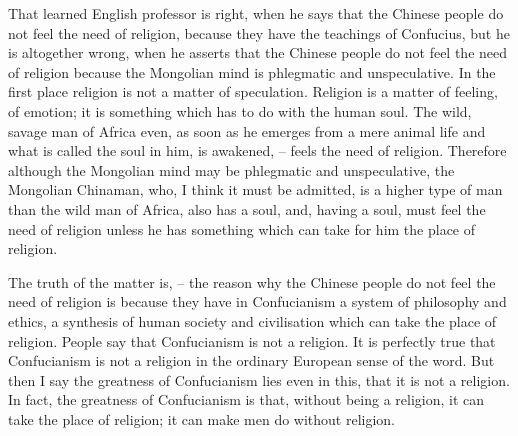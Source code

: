 That learned English professor is right, when he says that the Chinese people do not feel the need of religion, because they have the teachings of Confucius, but he is altogether wrong, when he asserts that the Chinese people do not feel the need of religion because the Mongolian mind is phlegmatic and unspeculative. In the first place religion is not a matter of speculation. Religion is a matter of feeling, of emotion; it is something which has to do with the human soul. The wild, savage man of Africa even, as soon as he emerges from a mere animal life and what is called the soul in him, is awakened,  --  feels the need of religion. Therefore although the Mongolian mind may be phlegmatic and unspeculative, the Mongolian Chinaman, who, I think it must be admitted, is a higher type of man than the wild man of Africa, also has a soul, and, having a soul, must feel the need of religion unless he has something which can take for him the place of religion.

The truth of the matter is,  -- the reason why the Chinese people do not feel the need of religion is because they have in Confucianism a system of philosophy and ethics, a synthesis of human society and civilisation which can take the place of religion. People say that Confucianism is not a religion. It is perfectly true that Confucianism is not a religion in the ordinary European sense of the word. But then I say the greatness of Confucianism lies even in this, that it is not a religion. In fact, the greatness of Confucianism is that, without being a religion, it can take the place of religion; it can make men do without religion.

